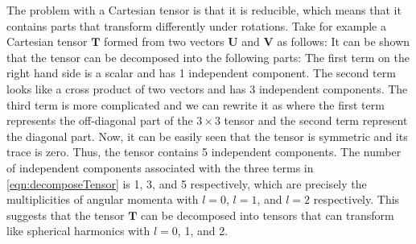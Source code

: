 The problem with a Cartesian tensor is that it is reducible, which means that it contains parts that
transform differently under rotations. Take for example a Cartesian tensor $\mathbf{T}$ formed from two vectors $\mathbf{U}$ and $\mathbf{V}$ as follows:
It can be shown that the tensor can be decomposed into the following parts:
The first term on the right hand side is a scalar and has 1 independent component. The second term looks like a 
cross product of two vectors  and has 3  independent components. The third term is more complicated and we can
rewrite it as
where the first term represents the off-diagonal part of the $3\times 3$ tensor and the second term represent the 
diagonal part. Now,  it can be easily seen that the tensor is symmetric and its trace is zero. Thus, the tensor contains
5 independent components. The number of independent components associated with the three terms in \autoref{eqn:decomposeTensor} is 1, 3, and 5 respectively, which are precisely the multiplicities of angular momenta
with $l=0$, $l=1$, and $l=2$ respectively. This suggests that the tensor $\mathbf{T}$ can be decomposed into tensors
that can transform like spherical harmonics with $l=0$, 1, and 2. 

